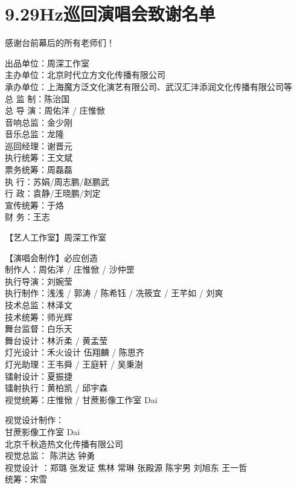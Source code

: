 \documentclass[]{ctexbook}
\begin{document}
\chapter{9.29Hz巡回演唱会致谢名单}\label{acknowledgements-list}

感谢台前幕后的所有老师们！

出品单位：周深工作室\\
主办单位：北京时代立方文化传播有限公司\\
承办单位：上海魔方泛文化演艺有限公司、武汉汇沣添润文化传播有限公司等\\
总 监 制：陈治国\\
总 导 演：周佑洋 / 庄惟惞\\
音响总监：金少刚\\
音乐总监：龙隆\\
巡回经理：谢晋元\\
执行统筹：王文斌\\
票务统筹：周磊磊\\
执 行：苏娟/周志鹏/赵鹏武\\
行 政：袁静/王晓鹏/刘定\\
宣传统筹：于烙\\
财 务：王志

【艺人工作室】周深工作室

【演唱会制作】必应创造\\
制作人：周佑洋 / 庄惟惞 / 沙仲罡\\
执行导演：刘婉莹\\
执行制作：浅浅 / 郭涛 / 陈希钰 / 冼筱宜 / 王芊如 / 刘爽\\
技术总监：林泽文\\
技术统筹：师光辉\\
舞台监督：白乐天\\
舞台设计：林沂柔 / 黄孟莹\\
灯光设计：禾火设计 伍翔麟 / 陈思齐\\
灯光助理：王韦舜 / 王庭轩 / 吴秉澍\\
镭射设计：夏振捷\\
镭射执行：黄柏凯 / 邱宇森\\
视觉统筹：庄惟惞 / 甘蔗影像工作室 Dai

视觉设计制作：\\
甘蔗影像工作室 Dai\\
北京千秋造热文化传播有限公司\\
视觉总监： 陈洪达 钟勇\\
视觉设计 ：郑璐 张发证 焦林 常琳 张殿源 陈宇男 刘旭东 王一哲\\
统筹：宋雪
\end{document}
